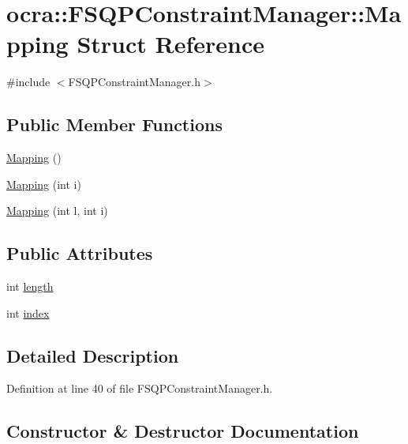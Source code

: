 \hypertarget{structocra_1_1FSQPConstraintManager_1_1Mapping}{}\section{ocra\+:\+:F\+S\+Q\+P\+Constraint\+Manager\+:\+:Mapping Struct Reference}
\label{structocra_1_1FSQPConstraintManager_1_1Mapping}


{\ttfamily \#include $<$F\+S\+Q\+P\+Constraint\+Manager.\+h$>$}

\subsection*{Public Member Functions}
\begin{DoxyCompactItemize}
\item 
\hyperlink{structocra_1_1FSQPConstraintManager_1_1Mapping_a71f614869ea1169fad3e51545a6c2385}{Mapping} ()
\item 
\hyperlink{structocra_1_1FSQPConstraintManager_1_1Mapping_a167e78a7d81b7024c6d63743c7fd4b2a}{Mapping} (int i)
\item 
\hyperlink{structocra_1_1FSQPConstraintManager_1_1Mapping_a82a59fc4b00d863a2527e5265a965441}{Mapping} (int l, int i)
\end{DoxyCompactItemize}
\subsection*{Public Attributes}
\begin{DoxyCompactItemize}
\item 
int \hyperlink{structocra_1_1FSQPConstraintManager_1_1Mapping_a223da0da4c89d6cbc8d025a867943194}{length}
\item 
int \hyperlink{structocra_1_1FSQPConstraintManager_1_1Mapping_a10fd8eae295eb4d5f9dc4258b065275b}{index}
\end{DoxyCompactItemize}


\subsection{Detailed Description}


Definition at line 40 of file F\+S\+Q\+P\+Constraint\+Manager.\+h.



\subsection{Constructor \& Destructor Documentation}
\hypertarget{structocra_1_1FSQPConstraintManager_1_1Mapping_a71f614869ea1169fad3e51545a6c2385}{}\label{structocra_1_1FSQPConstraintManager_1_1Mapping_a71f614869ea1169fad3e51545a6c2385} 
